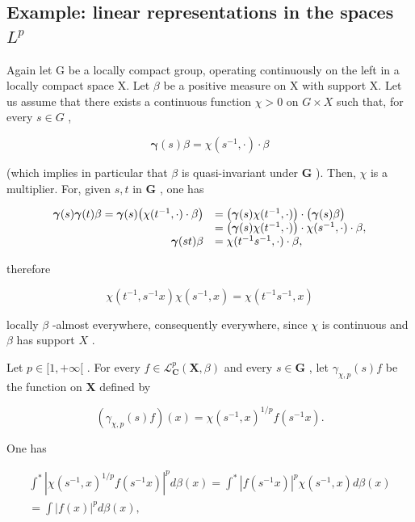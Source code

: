 \subsection{\texorpdfstring{Example: linear representations in the spaces \(L^{p}\)}{Example: linear representations in the spaces L\^{}\{p\}}}

Again let G be a locally compact group, operating continuously on the left in a locally compact space X. Let \(\beta\) be a positive measure on X with support X. Let us assume that there exists a continuous function \(\chi > 0\) on \(G \times X\) such that, for every \(s \in G\) ,

\[
\boldsymbol {\gamma} (s) \beta = \chi (s ^ {- 1}, \cdot) \cdot \beta
\]

(which implies in particular that \(\beta\) is quasi-invariant under \(\mathbf{G}\) ). Then, \(\chi\) is a multiplier. For, given \(s, t\) in \(\mathbf{G}\) , one has

\[
\begin{array}{r l} \boldsymbol {\gamma} (s) \boldsymbol {\gamma} (t) \beta = \boldsymbol {\gamma} (s) \big (\chi (t ^ {- 1}, \cdot) \cdot \beta \big) & = \big (\boldsymbol {\gamma} (s) \chi (t ^ {- 1}, \cdot) \big) \cdot \big (\boldsymbol {\gamma} (s) \beta \big) \\ & = \big (\boldsymbol {\gamma} (s) \chi (t ^ {- 1}, \cdot) \big) \cdot \chi (s ^ {- 1}, \cdot) \cdot \beta , \\ \boldsymbol {\gamma} (s t) \beta & = \chi (t ^ {- 1} s ^ {- 1}, \cdot) \cdot \beta , \end{array}
\]

therefore

\[
\chi (t ^ {- 1}, s ^ {- 1} x) \chi (s ^ {- 1}, x) = \chi (t ^ {- 1} s ^ {- 1}, x)
\]

locally \(\beta\) -almost everywhere, consequently everywhere, since \(\chi\) is continuous and \(\beta\) has support \(X\) .

Let \(p \in [1, +\infty[\) . For every \(f \in \mathcal{L}_{\mathbf{C}}^{p}(\mathbf{X}, \beta)\) and every \(s \in \mathbf{G}\) , let \(\gamma_{\chi,p}(s)f\) be the function on \(\mathbf{X}\) defined by

\[
\left(\gamma_ {\chi , p} (s) f\right) (x) = \chi (s ^ {- 1}, x) ^ {1 / p} f (s ^ {- 1} x).
\]

One has

\[
\begin{array}{c} \int^ {*} | \chi (s ^ {- 1}, x) ^ {1 / p} f (s ^ {- 1} x) | ^ {p} d \beta (x) = \int^ {*} | f (s ^ {- 1} x) | ^ {p} \chi (s ^ {- 1}, x) d \beta (x) \\ = \int | f (x) | ^ {p} d \beta (x), \end{array}
\]


